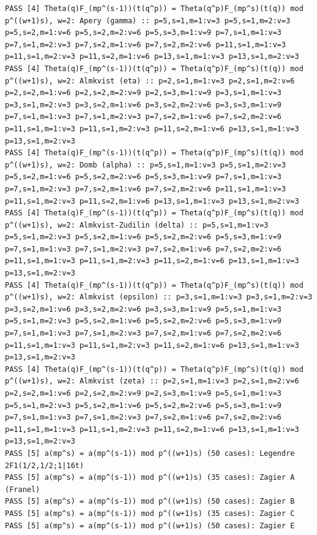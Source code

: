 \documentclass[11pt,a4paper]{article}
\theoremstyle{definition}\newtheorem{definition}[theorem]{Definition}
\theoremstyle{remark}\newtheorem{remark}[theorem]{Remark}
\numberwithin{equation}{section}
\begin{document}
\begin{lstlisting}
PASS [4] Theta(q)F_(mp^(s-1))(t(q^p)) = Theta(q^p)F_(mp^s)(t(q)) mod p^((w+1)s), w=2: Apery (gamma) :: p=5,s=1,m=1:v=3 p=5,s=1,m=2:v=3 p=5,s=2,m=1:v=6 p=5,s=2,m=2:v=6 p=5,s=3,m=1:v=9 p=7,s=1,m=1:v=3 p=7,s=1,m=2:v=3 p=7,s=2,m=1:v=6 p=7,s=2,m=2:v=6 p=11,s=1,m=1:v=3 p=11,s=1,m=2:v=3 p=11,s=2,m=1:v=6 p=13,s=1,m=1:v=3 p=13,s=1,m=2:v=3
PASS [4] Theta(q)F_(mp^(s-1))(t(q^p)) = Theta(q^p)F_(mp^s)(t(q)) mod p^((w+1)s), w=2: Almkvist (eta) :: p=2,s=1,m=1:v=3 p=2,s=1,m=2:v=6 p=2,s=2,m=1:v=6 p=2,s=2,m=2:v=9 p=2,s=3,m=1:v=9 p=3,s=1,m=1:v=3 p=3,s=1,m=2:v=3 p=3,s=2,m=1:v=6 p=3,s=2,m=2:v=6 p=3,s=3,m=1:v=9 p=7,s=1,m=1:v=3 p=7,s=1,m=2:v=3 p=7,s=2,m=1:v=6 p=7,s=2,m=2:v=6 p=11,s=1,m=1:v=3 p=11,s=1,m=2:v=3 p=11,s=2,m=1:v=6 p=13,s=1,m=1:v=3 p=13,s=1,m=2:v=3
PASS [4] Theta(q)F_(mp^(s-1))(t(q^p)) = Theta(q^p)F_(mp^s)(t(q)) mod p^((w+1)s), w=2: Domb (alpha) :: p=5,s=1,m=1:v=3 p=5,s=1,m=2:v=3 p=5,s=2,m=1:v=6 p=5,s=2,m=2:v=6 p=5,s=3,m=1:v=9 p=7,s=1,m=1:v=3 p=7,s=1,m=2:v=3 p=7,s=2,m=1:v=6 p=7,s=2,m=2:v=6 p=11,s=1,m=1:v=3 p=11,s=1,m=2:v=3 p=11,s=2,m=1:v=6 p=13,s=1,m=1:v=3 p=13,s=1,m=2:v=3
PASS [4] Theta(q)F_(mp^(s-1))(t(q^p)) = Theta(q^p)F_(mp^s)(t(q)) mod p^((w+1)s), w=2: Almkvist-Zudilin (delta) :: p=5,s=1,m=1:v=3 p=5,s=1,m=2:v=3 p=5,s=2,m=1:v=6 p=5,s=2,m=2:v=6 p=5,s=3,m=1:v=9 p=7,s=1,m=1:v=3 p=7,s=1,m=2:v=3 p=7,s=2,m=1:v=6 p=7,s=2,m=2:v=6 p=11,s=1,m=1:v=3 p=11,s=1,m=2:v=3 p=11,s=2,m=1:v=6 p=13,s=1,m=1:v=3 p=13,s=1,m=2:v=3
PASS [4] Theta(q)F_(mp^(s-1))(t(q^p)) = Theta(q^p)F_(mp^s)(t(q)) mod p^((w+1)s), w=2: Almkvist (epsilon) :: p=3,s=1,m=1:v=3 p=3,s=1,m=2:v=3 p=3,s=2,m=1:v=6 p=3,s=2,m=2:v=6 p=3,s=3,m=1:v=9 p=5,s=1,m=1:v=3 p=5,s=1,m=2:v=3 p=5,s=2,m=1:v=6 p=5,s=2,m=2:v=6 p=5,s=3,m=1:v=9 p=7,s=1,m=1:v=3 p=7,s=1,m=2:v=3 p=7,s=2,m=1:v=6 p=7,s=2,m=2:v=6 p=11,s=1,m=1:v=3 p=11,s=1,m=2:v=3 p=11,s=2,m=1:v=6 p=13,s=1,m=1:v=3 p=13,s=1,m=2:v=3
PASS [4] Theta(q)F_(mp^(s-1))(t(q^p)) = Theta(q^p)F_(mp^s)(t(q)) mod p^((w+1)s), w=2: Almkvist (zeta) :: p=2,s=1,m=1:v=3 p=2,s=1,m=2:v=6 p=2,s=2,m=1:v=6 p=2,s=2,m=2:v=9 p=2,s=3,m=1:v=9 p=5,s=1,m=1:v=3 p=5,s=1,m=2:v=3 p=5,s=2,m=1:v=6 p=5,s=2,m=2:v=6 p=5,s=3,m=1:v=9 p=7,s=1,m=1:v=3 p=7,s=1,m=2:v=3 p=7,s=2,m=1:v=6 p=7,s=2,m=2:v=6 p=11,s=1,m=1:v=3 p=11,s=1,m=2:v=3 p=11,s=2,m=1:v=6 p=13,s=1,m=1:v=3 p=13,s=1,m=2:v=3
PASS [5] a(mp^s) = a(mp^(s-1)) mod p^((w+1)s) (50 cases): Legendre 2F1(1/2,1/2;1|16t)
PASS [5] a(mp^s) = a(mp^(s-1)) mod p^((w+1)s) (35 cases): Zagier A (Franel)
PASS [5] a(mp^s) = a(mp^(s-1)) mod p^((w+1)s) (50 cases): Zagier B
PASS [5] a(mp^s) = a(mp^(s-1)) mod p^((w+1)s) (35 cases): Zagier C
PASS [5] a(mp^s) = a(mp^(s-1)) mod p^((w+1)s) (50 cases): Zagier E

\end{lstlisting}
\end{document}
